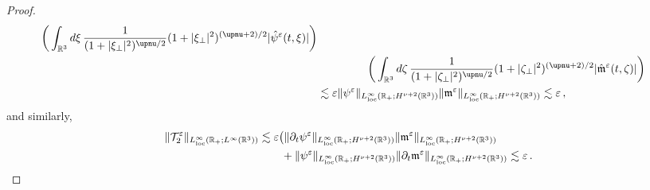 \documentclass[11pt,reqno]{amsart}
\def \R{{\mathbb{R}}}
\begin{document}
\begin{proof}
\begin{align*}
    \bigg(\int_{\R^3}d\xi \,   \frac{1}{(1+|\xi_\perp|^2)^{\upnu/2}}(1+|\xi_\perp|^2)^{(\upnu+2)/2}|\hat \psi^\varepsilon(t,\xi)| \bigg) \nonumber\\
    & \qquad \qquad \ \, \bigg(\int_{\R^3}d\zeta \,   \frac{1}{(1+|\zeta_\perp|^2)^{\upnu/2}}(1+|\zeta_\perp|^2)^{(\upnu+2)/2}|\hat{\mathfrak  m}^\varepsilon(t,\zeta)| \bigg) \nonumber\\
    & \lesssim \varepsilon \|\psi^\varepsilon \|_{L_{\rm loc}^\infty(\R_+;H^{\nu+2}(\R^3))}\|{\mathfrak  m}^\varepsilon \|_{L_{\rm loc}^\infty(\R_+;H^{\nu+2}(\R^3))} \lesssim \varepsilon \,,
  \end{align*}
  and similarly,
  \begin{align*}
    \|\mathcal T_2^\varepsilon \|_{L_{\rm loc}^\infty(\R_+;L^\infty(\R^3))}& \lesssim
    \varepsilon \big( \|\partial_t\psi^\varepsilon \|_{L_{\rm loc}^\infty(\R_+;H^{\nu+2}(\R^3))}\|{\mathfrak  m}^\varepsilon \|_{L_{\rm loc}^\infty(\R_+;H^{\nu+2}(\R^3))} \\
   &   \qquad + \|\psi^\varepsilon \|_{L_{\rm loc}^\infty(\R_+;H^{\nu+2}(\R^3))}\|\partial_t{\mathfrak  m}^\varepsilon \|_{L_{\rm loc}^\infty(\R_+;H^{\nu+2}(\R^3))}
    \lesssim \varepsilon\,.
  \end{align*}
 \end{proof}  



\appendix
\end{document}

